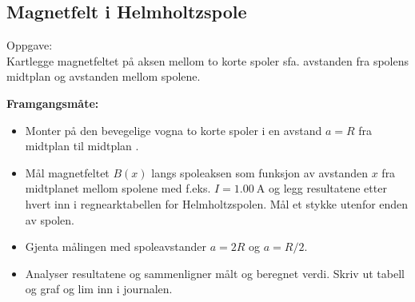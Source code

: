 \documentclass[../Elmag-labhefte-2020.tex]{subfiles}
\begin{document}
\subsection{Magnetfelt i Helmholtzspole}

Oppgave:\\
{\itsf Kartlegge magnetfeltet på aksen mellom to korte spoler sfa. avstanden fra spolens midtplan og avstanden mellom spolene.}
 
\textbf{Framgangsmåte:}
\vspace{-5mm}
\begin{itemize}
    \item Monter på den bevegelige vogna to korte spoler i en avstand $a = R$ fra midtplan til midtplan .
    \item Mål magnetfeltet $B(x)$ langs spoleaksen som funksjon av avstanden $x$ fra midtplanet mellom spolene med f.eks. $I = \SI{1,00}{\ampere}$ og legg resultatene etter hvert inn i regnearktabellen for Helmholtzspolen. Mål et stykke utenfor enden av spolen.
    \item Gjenta målingen med spoleavstander $a = 2R$ og $a = R/2$.
    \item Analyser resultatene og sammenligner målt og beregnet verdi. Skriv ut tabell og graf og lim inn i journalen.
\end{itemize}
\end{document}
